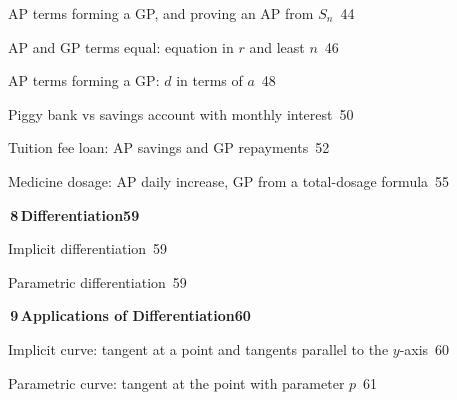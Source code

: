 \documentclass[a4paper,openany]{book}
\begin{document}
{\noindent{}\quad AP terms forming a GP, and proving an AP from $S_n$\dotfill\ 44\par
\noindent{}\quad AP and GP terms equal: equation in $r$ and least $n$\dotfill\ 46\par
\noindent{}\quad AP terms forming a GP: $d$ in terms of $a$\dotfill\ 48\par
\noindent{}\quad Piggy bank vs savings account with monthly interest\dotfill\ 50\par
\noindent{}\quad Tuition fee loan: AP savings and GP repayments\dotfill\ 52\par
\noindent{}\quad Medicine dosage: AP daily increase, GP from a total-dosage formula\dotfill\ 55\par
\medskip\noindent\colorbox{blue!8}{\parbox{\dimexpr\textwidth-2\fboxsep}{\large\bfseries\color{blue!50!black}\colorbox{blue!50!black}{\color{white}\,8\,}\quad Differentiation\hfill 59}}\par\nopagebreak\smallskip\nopagebreak
\noindent{}\quad Implicit differentiation\dotfill\ 59\par
\noindent{}\quad Parametric differentiation\dotfill\ 59\par
\medskip\noindent\colorbox{blue!8}{\parbox{\dimexpr\textwidth-2\fboxsep}{\large\bfseries\color{blue!50!black}\colorbox{blue!50!black}{\color{white}\,9\,}\quad Applications of Differentiation\hfill 60}}\par\nopagebreak\smallskip\nopagebreak
\noindent{}\quad Implicit curve: tangent at a point and tangents parallel to the $y$-axis\dotfill\ 60\par
\noindent{}\quad Parametric curve: tangent at the point with parameter $p$\dotfill\ 61\par
}
\end{document}
